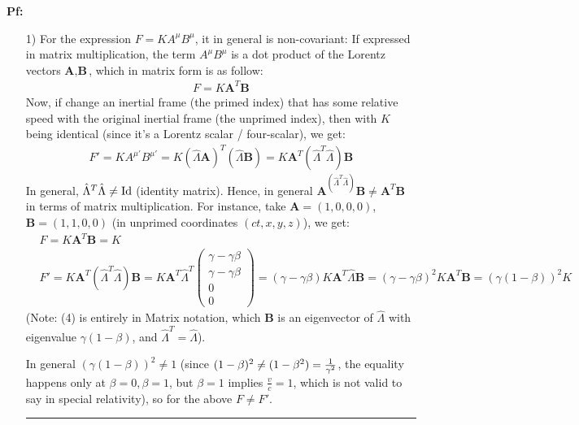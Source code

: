 \documentclass{article}
\newcommand{\Id}{\textmd{Id}} %
\DeclarePairedDelimiter{\paran}{(}{)}%
\newcommand{\bA}{\textbf{A}}
\newcommand{\bB}{\textbf{B}}
\begin{document}
\textbf{Pf:}
\begin{itemize}
    \item[1)] For the expression $F=KA^\mu B^\mu$, it in general is non-covariant: If expressed in matrix multiplication, the term $A^\mu B^\mu$ is a dot product of the Lorentz vectors $\textbf{A},\textbf{B}$, which in matrix form is as follow:
    \begin{align}
        F = K\textbf{A}^T\textbf{B}
    \end{align}
    Now, if change an inertial frame (the primed index) that has some relative speed with the original inertial frame (the unprimed index), then with $K$ being identical (since it's a Lorentz scalar / four-scalar), we get:
    \begin{align}
        F' = KA^{\mu'}B^{\mu'} = K(\hat{\Lambda}\textbf{A})^T (\hat{\Lambda}\textbf{B}) = K\textbf{A}^T(\hat{\Lambda}^T\hat{\Lambda})\textbf{B}
    \end{align}
    In general, $\hat{\Lambda}^T\hat{\Lambda}\neq \Id$ (identity matrix). Hence, in general $\textbf{A}^(\hat{\Lambda}^T\hat{\Lambda})\textbf{B}\neq \textbf{A}^T\textbf{B}$ in terms of matrix multiplication. For instance, take $\textbf{A}=(1,0,0,0)$, $\textbf{B}=(1,1,0,0)$ (in unprimed coordinates $(ct,x,y,z)$), we get:
    \begin{align}
        &F = K\bA^T\bB = K\\
        &F' = K\textbf{A}^T(\hat{\Lambda}^T\hat{\Lambda})\textbf{B} = K\textbf{A}^T\hat{\Lambda}^T\begin{pmatrix}
            \gamma - \gamma\beta \\ \gamma - \gamma\beta \\ 0 \\ 0
        \end{pmatrix} = (\gamma-\gamma\beta)K\textbf{A}^T\hat{\Lambda}\textbf{B} = (\gamma-\gamma\beta)^2K\textbf{A}^T\textbf{B} = (\gamma(1-\beta))^2K
    \end{align}
    (Note: (4) is entirely in Matrix notation, which $\bB$ is an eigenvector of $\hat{\Lambda}$ with eigenvalue $\gamma(1-\beta)$, and $\hat{\Lambda}^T=\hat{\Lambda}$).

    In general $(\gamma(1-\beta))^2\neq 1$ (since $(1-\beta)^2 \neq \paran{1-\beta^2}=\frac{1}{\gamma^2}$, the equality happens only at $\beta=0, \beta=1$, but $\beta=1$ implies $\frac{v}{c}=1$, which is not valid to say in special relativity), so for the above $F\neq F'$.

    \rule{15.6cm}{0,1mm}


\end{itemize}
\end{document}
